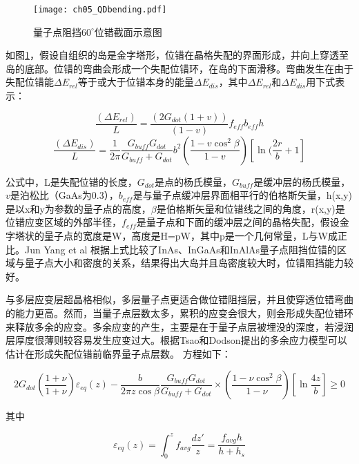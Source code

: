 \begin{figure}[ht]
	\centering
	\texttt{[image: ch05\_QDbending.pdf]}
	\caption{量子点阻挡$60^\circ$位错截面示意图}
	\label{fig:QDbending}
\end{figure}


如图\ref{fig:QDbending}，假设自组织的岛是金字塔形，位错在晶格失配的界面形成，并向上穿透至岛的底部。位错的弯曲会形成一个失配位错环，在岛的下面滑移。弯曲发生在由于失配位错能$\Delta E_{rel}$等于或大于位错本身的能量$\Delta E_{dis}$\cite{Tillmann2000}\cite{Ovidko2002}，其中$\Delta E_{rel}$和$\Delta E_{dis}$用下式表示：

\begin{equation}
	\label{eq:Erel}
	\frac{( \Delta E_{rel})}{L}=\frac{(2G_{dot} (1+v))}{(1-v)}f_{eff} b_{eff}h
\end{equation}
\begin{equation}
	\label{eq:Edis}
	\frac{( \Delta E_{dis})}{L} = \frac{1}{2\pi} \frac{G_{buff} G_{dot}}{G_{buff} + G_{dot}} b^2 (\frac{1-v\cos^2\beta}{1-v})[\ln(\frac{2r}{b}+1]
\end{equation}

公式中，L是失配位错的长度，$G_{dot}$是点的杨氏模量，$G_{buff}$是缓冲层的杨氏模量，$v$是泊松比（GaAs为0.3），$b_{eff}$是与量子点缓冲层界面相平行的伯格斯矢量，h(x,y)是以x和y为参数的量子点的高度，$\beta$是伯格斯矢量和位错线之间的角度，r(x,y)是位错应变区域的外部半径，$f_{eff}$是量子点和下面的缓冲层之间的晶格失配，假设金字塔状的量子点的宽度是W，高度是H=pW，其中p是一个几何常量，L与W成正比。Jun Yang et al \cite{NoCite}根据上式比较了InAs、InGaAs和InAlAs量子点阻挡位错的区域与量子点大小和密度的关系，结果得出大岛并且岛密度较大时，位错阻挡能力较好。

与多层应变层超晶格相似，多层量子点更适合做位错阻挡层，并且使穿透位错弯曲的能力更高。然而，当量子点层数太多，累积的应变会很大，则会形成失配位错环来释放多余的应变。多余应变的产生，主要是在于量子点层被埋没的深度，若浸润层厚度很薄则较容易发生应变过大。根据Tsao和Dodson提出的多余应力模型\cite{Tsao1988}可以估计在形成失配位错前临界量子点层数。
方程如下：

\begin{equation}
	\label{eq:tsao}
	2G_{dot} (\frac{1+\nu}{1+\nu}) \varepsilon_{eq}(z) - \frac{b}{2 \pi z \cos\beta} \frac{G_{buff} G_{dot}}{G_{buff}+G_{dot}} \times (\frac{1-\nu\cos^2\beta}{1-\nu}) [\ln⁡ \frac{4z}{b}] \geq 0 
\end{equation}

其中

\begin{equation}
	\label{eq:epsilon_eq}
	\varepsilon_{eq} (z) =  \int_0^z f_{avg}\frac{dz'}{z}  = \frac{f_{avg}h}{h+h_s}
\end{equation}


